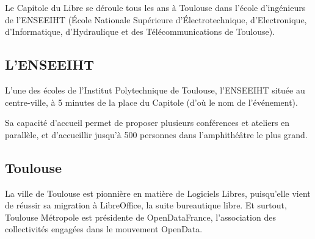 
Le Capitole du Libre se déroule tous les ans à Toulouse dans l'école
 d'ingénieurs de l'ENSEEIHT (École Nationale Supérieure
 d'Électrotechnique, d'Electronique, d'Informatique, d'Hydraulique
 et des Télécommunications de Toulouse). 

\subsection{L'ENSEEIHT}

L'une des écoles de l'Institut Polytechnique de Toulouse, l'ENSEEIHT
 située au centre-ville, à 5 minutes de la place du Capitole (d'où le
 nom de l'événement).

Sa capacité d'accueil permet de proposer plusieurs conférences et
 ateliers en parallèle, et d'accueillir jusqu'à 500 personnes dans
 l'amphithéâtre le plus grand.

\subsection{Toulouse}

La ville de Toulouse est pionnière en matière de Logiciels Libres,
 puisqu'elle vient de réussir sa migration à LibreOffice, la suite
 bureautique libre. Et surtout, Toulouse Métropole est présidente
 de OpenDataFrance, l'association des collectivités engagées dans
 le mouvement OpenData.

